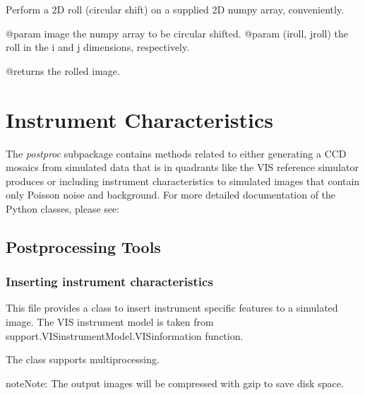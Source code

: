 \documentclass[a4paper,11pt,english]{sphinxmanual}
\begin{document}

\begin{fulllineitems}
\label{instrument:sandbox.MTF.roll2d}
Perform a 2D roll (circular shift) on a supplied 2D numpy array, conveniently.

@param image            the numpy array to be circular shifted.
@param (iroll, jroll)   the roll in the i and j dimensions, respectively.

@returns the rolled image.

\end{fulllineitems}



\section{Instrument Characteristics}
\label{index:instrument-characteristics}
The \emph{postproc} subpackage contains methods related to either generating a CCD mosaics from simulated data
that is in quadrants like the VIS reference simulator produces or including instrument characteristics
to simulated images that contain only Poisson noise and background. For more detailed documentation
of the Python classes, please see:


\subsection{Postprocessing Tools}
\label{postproc:postprocessing-tools}\label{postproc::doc}\label{postproc:module-postproc.postprocessing}

\subsubsection{Inserting instrument characteristics}
\label{postproc:inserting-instrument-characteristics}
This file provides a class to insert instrument specific features to a simulated image. The VIS instrument
model is taken from support.VISinstrumentModel.VISinformation function.

The class supports multiprocessing.

\begin{notice}{note}{Note:}
The output images will be compressed with gzip to save disk space.
\end{notice}
\end{document}
